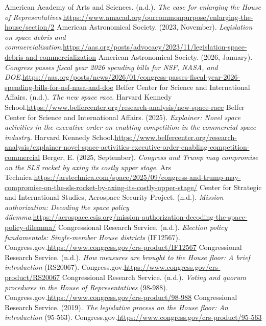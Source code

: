 
\begin{referencelist}
   American Academy of Arts and Sciences. (n.d.). \emph{The case for enlarging the House of Representatives}.\url{https://www.amacad.org/ourcommonpurpose/enlarging-the-house/section/2}
   American Astronomical Society. (2023, November). \emph{Legislation on space debris and commercialization}.\url{https://aas.org/posts/advocacy/2023/11/legislation-space-debris-and-commercialization}
   American Astronomical Society. (2026, January). \emph{Congress passes fiscal year 2026 spending bills for NSF, NASA, and DOE}.\url{https://aas.org/posts/news/2026/01/congress-passes-fiscal-year-2026-spending-bills-for-nsf-nasa-and-doe}
   Belfer Center for Science and International Affairs. (n.d.). \emph{The new space race}. Harvard Kennedy School.\url{https://www.belfercenter.org/research-analysis/new-space-race}
   Belfer Center for Science and International Affairs. (2025). \emph{Explainer: Novel space activities in the executive order on enabling competition in the commercial space industry}. Harvard Kennedy School.\url{https://www.belfercenter.org/research-analysis/explainer-novel-space-activities-executive-order-enabling-competition-commercial}
   Berger, E. (2025, September). \emph{Congress and Trump may compromise on the SLS rocket by axing its costly upper stage}. Ars Technica.\url{https://arstechnica.com/space/2025/09/congress-and-trump-may-compromise-on-the-sls-rocket-by-axing-its-costly-upper-stage/}
   Center for Strategic and International Studies, Aerospace Security Project. (n.d.). \emph{Mission authorization: Decoding the space policy dilemma}.\url{https://aerospace.csis.org/mission-authorization-decoding-the-space-policy-dilemma/}
   Congressional Research Service. (n.d.). \emph{Election policy fundamentals: Single-member House districts} (IF12567). Congress.gov.\url{https://www.congress.gov/crs-product/IF12567}
   Congressional Research Service. (n.d.). \emph{How measures are brought to the House floor: A brief introduction} (RS20067). Congress.gov.\url{https://www.congress.gov/crs-product/RS20067}
   Congressional Research Service. (n.d.). \emph{Voting and quorum procedures in the House of Representatives} (98-988). Congress.gov.\url{https://www.congress.gov/crs-product/98-988}
   Congressional Research Service. (2019). \emph{The legislative process on the House floor: An introduction} (95-563). Congress.gov.\url{https://www.congress.gov/crs-product/95-563}

\end{referencelist}
